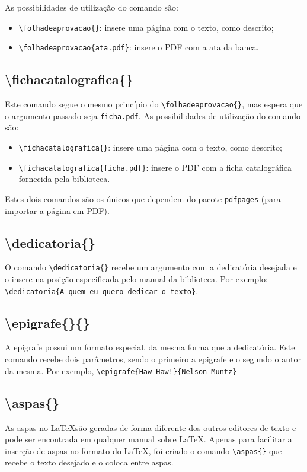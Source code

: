 \documentclass{fei}
\begin{document}
    As possibilidades de utilização do comando são:
    \begin{itemize}
        \item \verb+\folhadeaprovacao{}+: insere uma página com o texto, como descrito;
        \item \verb+\folhadeaprovacao{ata.pdf}+: insere o PDF com a ata da banca.
    \end{itemize}
    
    
    \subsection{\textbackslash fichacatalografica\{\}}
    Este comando segue o mesmo princípio do \verb+\folhadeaprovacao{}+, mas espera que o argumento passado seja \texttt{ficha.pdf}. As possibilidades de utilização do comando são:
    \begin{itemize}
        \item \verb+\fichacatalografica{}+: insere uma página com o texto, como descrito;
        \item \verb+\fichacatalografica{ficha.pdf}+: insere o PDF com a ficha catalográfica fornecida pela biblioteca.
    \end{itemize}
 
 Estes dois comandos são os únicos que dependem do pacote \verb+pdfpages+ (para importar a página em PDF).

    \subsection{\textbackslash dedicatoria\{\}}
    O comando \verb+\dedicatoria{}+ recebe um argumento com a dedicatória desejada e o insere na posição especificada pelo manual da biblioteca. Por exemplo: \\ \verb+\dedicatoria{A quem eu quero dedicar o texto}+.
    
    \subsection{\textbackslash epigrafe\{\}\{\}}
    A epigrafe possui um formato especial, da mesma forma que a dedicatória. Este comando recebe dois parâmetros, sendo o primeiro a epigrafe e o segundo o autor da mesma. Por exemplo, \verb+\epigrafe{Haw-Haw!}{Nelson Muntz}+
    
    \subsection{\textbackslash aspas\{\}}
    As aspas no \LaTeX são geradas de forma diferente dos outros editores de texto e pode ser encontrada em qualquer manual sobre \LaTeX. Apenas para facilitar a inserção de aspas no formato do \LaTeX, foi criado o comando \verb+\aspas{}+ que recebe o texto desejado e o coloca entre aspas.
\end{document}
